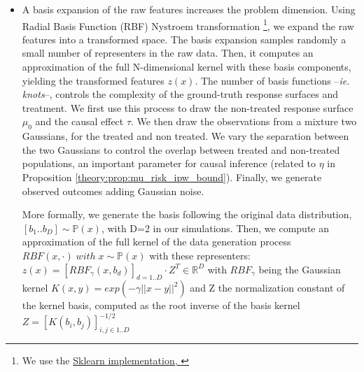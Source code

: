 \documentclass[11pt]{article}
\let\cite=\supercite
\begin{document}
\begin{appendices}
\begin{itemize}
        \item A basis expansion of the raw features increases the problem dimension.
              Using Radial Basis Function (RBF) Nystroem transformation \footnote{We
                  use the
                  \href{https://scikit-learn.org/stable/modules/generated/sklearn.kernel_approximation.Nystroem.html}{Sklearn
                      implementation, \cite{pedregosa_scikitlearn_2011}}}, we expand the raw
              features into a transformed space. The basis expansion samples
              randomly a small number of representers in the raw data. Then,  it
              computes an approximation of the full N-dimensional kernel with these
              basis components, yielding the transformed features $z(x)$. The number
              of basis functions --\emph{ie. knots}--, controls the complexity of
              the ground-truth response surfaces and treatment. We first use this
              process to draw the non-treated response surface $\mu_0$ and the
              causal effect $\tau$. We then draw the observations from a mixture two
              Gaussians, for the treated and non treated. We vary the separation
              between the two Gaussians to control the overlap between treated and
              non-treated populations, an important parameter for causal inference
              (related to $\eta$ in Proposition
              \ref{theory:prop:mu_risk_ipw_bound}). Finally, we generate observed
              outcomes adding Gaussian noise.

              More formally, we generate the basis following the original data
              distribution, $\left [ b_1 .. b_D \right ] \sim \mathbb P(x)$,
              with D=2 in our simulations. Then, we compute an approximation
              of the full kernel of the data generation process $RBF(x,
                  \cdot) \;  with \; x \sim \mathbb P(x)$ with these
              representers: $z(x) = [RBF_{\gamma}(x, b_d)]_{d=1..D} \cdot
                  Z^T \in \mathbb{R}^D$ with $RBF_{\gamma}$ being the Gaussian
              kernel $K(x, y) = exp(-\gamma ||x-y||^2)$ and Z the
              normalization constant of the kernel basis, computed as the
              root inverse of the basis kernel $Z=[K(b_i, b_j)]_{i, j \in
                  {1..D}}^{-1/2}$



\end{itemize}
\end{appendices}
\end{document}
